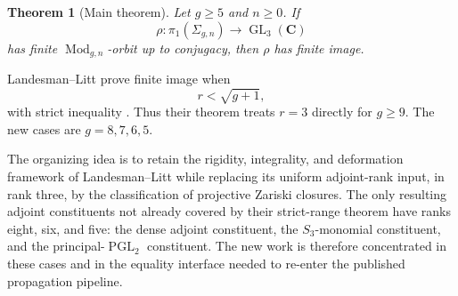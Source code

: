 \documentclass[11pt]{article}
\newtheorem{theorem}{Theorem}[section]
\theoremstyle{definition}
\newcommand{\C}{\mathbf C}
\newcommand{\Mod}{\operatorname{Mod}}
\newcommand{\GL}{\operatorname{GL}}
\newcommand{\PGL}{\operatorname{PGL}}
\begin{document}
\begin{theorem}[Main theorem]\label{thm:main}
Let $g\ge5$ and $n\ge0$.  If
\[
 \rho:\pi_1(\Sigma_{g,n})\longrightarrow \GL_3(\C)
\]
has finite $\Mod_{g,n}$-orbit up to conjugacy, then $\rho$ has finite image.
\end{theorem}

Landesman--Litt prove finite image when
\[
 r<\sqrt{g+1},
\]
with strict inequality \cite[Theorem 1.2.1]{LLCan}.  Thus their theorem treats
$r=3$ directly for $g\ge9$.  The new cases are $g=8,7,6,5$.

The organizing idea is to retain the rigidity, integrality, and deformation
framework of Landesman--Litt while replacing its uniform adjoint-rank input,
in rank three, by the classification of projective Zariski closures.  The
only resulting adjoint constituents not already covered by their strict-range
theorem have ranks eight, six, and five: the dense adjoint constituent, the
$S_3$-monomial constituent, and the principal-$\PGL_2$ constituent.  The new
work is therefore concentrated in these cases and in the equality interface
needed to re-enter the published propagation pipeline.
\end{document}
